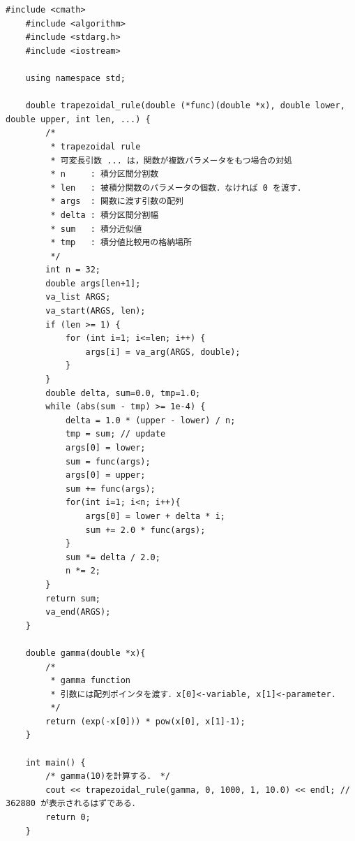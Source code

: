 \documentclass[a4j,papersize,disablejfam,slide,14pt]{jsarticle}
\begin{document}
    \begin{lstlisting}[style=customCpp]
    #include <cmath>
    #include <algorithm>
	#include <stdarg.h>
    #include <iostream>
    
    using namespace std;
    
    double trapezoidal_rule(double (*func)(double *x), double lower, double upper, int len, ...) {
		/*
		 * trapezoidal rule
		 * 可変長引数 ... は，関数が複数パラメータをもつ場合の対処
		 * n     : 積分区間分割数
		 * len   : 被積分関数のパラメータの個数．なければ 0 を渡す．
		 * args  : 関数に渡す引数の配列
		 * delta : 積分区間分割幅
		 * sum   : 積分近似値
		 * tmp   : 積分値比較用の格納場所
		 */
		int n = 32;
		double args[len+1];
		va_list ARGS;
		va_start(ARGS, len);
		if (len >= 1) {
			for (int i=1; i<=len; i++) {
				args[i] = va_arg(ARGS, double);
			}
		}
		double delta, sum=0.0, tmp=1.0;
		while (abs(sum - tmp) >= 1e-4) {
			delta = 1.0 * (upper - lower) / n;
			tmp = sum; // update
			args[0] = lower;
			sum = func(args);
			args[0] = upper;
			sum += func(args);
			for(int i=1; i<n; i++){
				args[0] = lower + delta * i;
				sum += 2.0 * func(args);
			}
			sum *= delta / 2.0;
			n *= 2;
		}
		return sum;
	    va_end(ARGS);
	}
    
    double gamma(double *x){
		/* 
         * gamma function 
         * 引数には配列ポインタを渡す．x[0]<-variable, x[1]<-parameter.
         */
	    return (exp(-x[0])) * pow(x[0], x[1]-1);
	}
    
    int main() {
    	/* gamma(10)を計算する． */
    	cout << trapezoidal_rule(gamma, 0, 1000, 1, 10.0) << endl; // 362880 が表示されるはずである．
        return 0;
    }
    \end{lstlisting}
\end{document}
